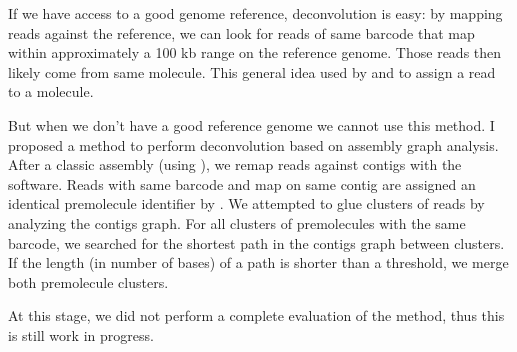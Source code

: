 \documentclass[main.tex]{subfiles}
\begin{document}
If we have access to a good genome reference, deconvolution is easy: by mapping reads against the reference, we can look for reads of same barcode that map within approximately a 100 kb range on the reference genome. Those reads then likely come from same molecule. This general idea used by \cite{ema} and \cite{lariat} to assign a read to a molecule.

But when we don't have a good reference genome we cannot use this method. 
I proposed a method to perform deconvolution based on assembly graph analysis.
After a classic \DBG assembly (using ), we remap reads against contigs with the   software. Reads with same barcode and map on same contig are assigned an identical premolecule identifier by . We attempted to glue clusters of reads by analyzing the contigs graph. For all clusters of premolecules with the same barcode, we searched for the shortest path in the contigs graph between clusters. If the length (in number of bases) of a path is shorter than a threshold, we merge both premolecule clusters. 

At this stage, we did not perform a complete evaluation of the method, thus this is still work in progress.
\end{document}
